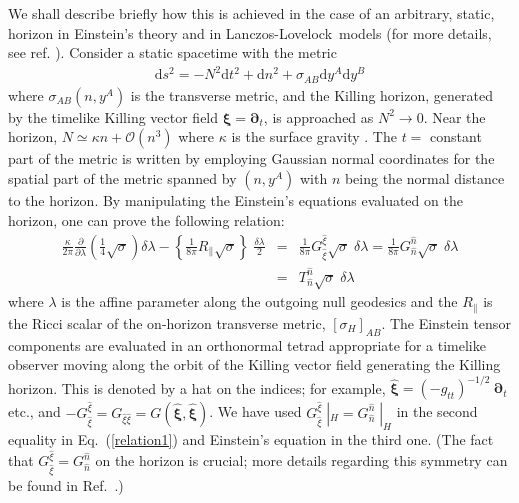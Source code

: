 \documentclass[12pt]{iopart}
\newcommand{\bm}[1]{\boldsymbol{#1}}
\def\DM{\mathrm{d}}
\def\hatxi{\widehat{\xi}}
\def\hatn{\widehat{n}}
\def\eq#1{{Eq.~(\ref{#1})}}
\newcommand{\LL}{Lanczos-Lovelock}
\begin{document}
We shall describe briefly how this is achieved in the case of an arbitrary, static, horizon in Einstein's theory and in \LL\ models (for more details, see ref. \cite{tpdawoodgentds}). Consider a static spacetime with the metric
\begin{eqnarray}
{\DM}s^2 = - N^2 {\DM}t^2 + {\DM}n^2 + \sigma_{A B} {\DM}y^A {\DM}y^B
\label{static-metric}
\end{eqnarray}
where $\sigma_{A B}(n, y^A)$ is the transverse metric, and the Killing horizon, generated by the timelike Killing vector field $\bm{\xi} = \bm{\partial}_t$, is approached as $N^2 \rightarrow 0$. Near the horizon, $N \simeq \kappa n + \mathcal{O}(n^3)$ where $\kappa$ is the surface gravity \cite{dirtyBH}. The $t=$ constant part of the metric is written by employing Gaussian normal coordinates for the spatial part of the  metric spanned by $\left( {n, y^A} \right)$
with  $n$ being the normal distance to the horizon. By manipulating the Einstein's equations evaluated on the horizon, one can prove \cite{tpdawoodgentds} the following relation:
\begin{eqnarray}
\frac{\kappa}{2 \pi} \frac{\partial}{\partial \lambda} \left( \frac{1}{4} \sqrt{\sigma} \right) {\delta \lambda} - \left\{ \frac{1}{8 \pi} R_{\parallel} \sqrt{\sigma} \right\} \; \frac{\delta \lambda}{2} &=& \frac{1}{8 \pi} G^{\hatxi}_{\hatxi} \sqrt{\sigma} \; \delta \lambda 
= \frac{1}{8 \pi} G^{\hatn}_{\hatn} \sqrt{\sigma} \; \delta \lambda
\nonumber\\
 &=& T^{\hatn}_{\hatn} \sqrt{\sigma} \; \delta \lambda 
 \label{relation1}
\end{eqnarray}
where $\lambda$ is the affine parameter along the outgoing null geodesics and  the $R_{\parallel}$ is the Ricci scalar of the on-horizon transverse metric, $\left[ \sigma_H \right]_{A B}$. The Einstein tensor components are evaluated in an orthonormal tetrad appropriate for a timelike observer moving along the orbit of the Killing vector field generating the Killing horizon. This is denoted by a hat on the indices; for example, $\bm{\hatxi} = \left( - g_{t t} \right)^{-1/2}~\bm{\partial}_t$ etc., and $-G^{\hatxi}_{\hatxi} = G_{{\hatxi} {\hatxi}} = G( \bm{\hatxi}, \bm{\hatxi} )$.  We have used $G^{\hatxi}_{\hatxi} \;|_H = G^{\hatn}_{\hatn} \;|_H$ in the second equality
 in \eq{relation1}
 and Einstein's equation in the third one. (The fact that $G^{\hatxi}_{\hatxi}  = G^{\hatn}_{\hatn}$ on the horizon is crucial;  more details regarding this symmetry can be found
 in Ref.~\cite{dirtyBH}.)
\end{document}
